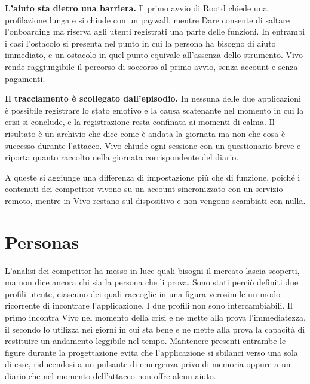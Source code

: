 \textbf{L'aiuto sta dietro una barriera.}
Il primo avvio di Rootd chiede una profilazione lunga e si chiude con un paywall, mentre Dare consente di saltare l'onboarding ma riserva agli utenti registrati una parte delle funzioni.
In entrambi i casi l'ostacolo si presenta nel punto in cui la persona ha bisogno di aiuto immediato, e un ostacolo in quel punto equivale all'assenza dello strumento.
Vivo rende raggiungibile il percorso di soccorso al primo avvio, senza account e senza pagamenti.

\textbf{Il tracciamento è scollegato dall'episodio.}
In nessuna delle due applicazioni è possibile registrare lo stato emotivo e la causa scatenante nel momento in cui la crisi si conclude, e la registrazione resta confinata ai momenti di calma.
Il risultato è un archivio che dice come è andata la giornata ma non che cosa è successo durante l'attacco.
Vivo chiude ogni sessione con un questionario breve e riporta quanto raccolto nella giornata corrispondente del diario.

A queste si aggiunge una differenza di impostazione più che di funzione, poiché i contenuti dei competitor vivono su un account sincronizzato con un servizio remoto, mentre in Vivo restano sul dispositivo e non vengono scambiati con nulla.

\section{Personas}
\label{sec:personas}

L'analisi dei competitor ha messo in luce quali bisogni il mercato lascia scoperti, ma non dice ancora chi sia la persona che li prova.
Sono stati perciò definiti due profili utente, ciascuno dei quali raccoglie in una figura verosimile un modo ricorrente di incontrare l'applicazione.
I due profili non sono intercambiabili.
Il primo incontra Vivo nel momento della crisi e ne mette alla prova l'immediatezza, il secondo lo utilizza nei giorni in cui sta bene e ne mette alla prova la capacità di restituire un andamento leggibile nel tempo.
Mantenere presenti entrambe le figure durante la progettazione evita che l'applicazione si sbilanci verso una sola di esse, riducendosi a un pulsante di emergenza privo di memoria oppure a un diario che nel momento dell'attacco non offre alcun aiuto.

